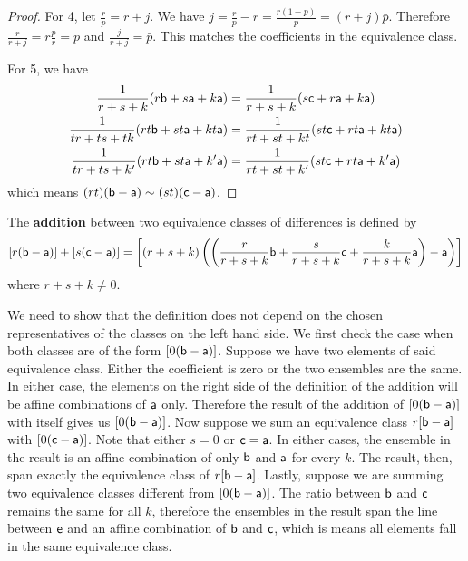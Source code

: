 \begin{mathSection}
\begin{proof}
		For 4, let $\frac{r}{p}=r+j$. We have $j = \frac{r}{p}-r = \frac{r(1-p)}{p} = (r+j)\bar{p}$. Therefore $\frac{r}{r+j} = r\frac{p}{r} = p$ and $\frac{j}{r+j} = \bar{p}$. This matches the coefficients in the equivalence class.
		
		For 5, we have
		\begin{equation}
			\begin{aligned}
				\frac{1}{r+s+k} (r \ens[b] + s \ens[a] + k \ens[a]) &= \frac{1}{r+s+k} (s \ens[c] + r \ens[a] + k \ens[a]) \\
				\frac{1}{tr+ts+tk} (rt \ens[b] + st \ens[a] + kt \ens[a]) &= \frac{1}{rt+st+kt} (st \ens[c] + rt \ens[a] + kt \ens[a]) \\
				\frac{1}{tr+ts+k'} (rt \ens[b] + st \ens[a] + k' \ens[a]) &= \frac{1}{rt+st+k'} (st \ens[c] + rt \ens[a] + k' \ens[a])
			\end{aligned}
		\end{equation}
		which means $(rt)(\ens[b] - \ens[a]) \sim (st)(\ens[c] - \ens[a])$.
	\end{proof}
	
	\begin{defn}
		The \textbf{addition} between two equivalence classes of differences is defined by 
		$$\left[r(\ens[b] - \ens[a])\right] + \left[s(\ens[c] - \ens[a])\right] = \left[(r+s+k) \left(\left(\frac{r}{r+s+k}\ens[b] + \frac{s}{r+s+k} \ens[c] +\frac{k}{r+s+k} \ens[a] \right) - \ens[a]\right)\right]$$
		where $r+s+k \neq 0$.
	\end{defn}
	\begin{check}
		We need to show that the definition does not depend on the chosen representatives of the classes on the left hand side. We first check the case when both classes are of the form $[0(\ens[b] - \ens[a])]$. Suppose we have two elements of said equivalence class. Either the coefficient is zero or the two ensembles are the same. In either case, the elements on the right side of the definition of the addition will be affine combinations of $\ens[a]$ only. Therefore the result of the addition of $[0(\ens[b] - \ens[a])]$ with itself gives us $[0(\ens[b] - \ens[a])]$. Now suppose we sum an equivalence class $r[\ens[b] - \ens[a]]$ with $[0(\ens[c] - \ens[a])]$. Note that either $s=0$ or $\ens[c]=\ens[a]$. In either cases, the ensemble in the result is an affine combination of only $\ens[b]$ and $\ens[a]$ for every $k$. The result, then, span exactly the equivalence class of $r[\ens[b] - \ens[a]]$. Lastly, suppose we are summing two equivalence classes different from $[0(\ens[b] - \ens[a])]$. The ratio between $\ens[b]$ and $\ens[c]$ remains the same for all $k$, therefore the ensembles in the result span the line between $\ens$ and an affine combination of $\ens[b]$ and $\ens[c]$, which is means all elements fall in the same equivalence class.
	\end{check}
	

\end{mathSection}

